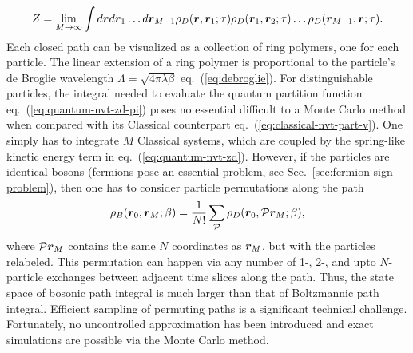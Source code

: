 \begin{align} \label{eq:quantum-nvt-zd-pi}
Z=\lim\limits_{M\rightarrow\infty} \int d\boldsymbol{r} d\boldsymbol{r}_1\dots d\boldsymbol{r}_{M-1}
\rho_D(\boldsymbol{r},\boldsymbol{r}_1;\tau)\rho_D(\boldsymbol{r}_1,\boldsymbol{r}_2;\tau)\dots\rho_D(\boldsymbol{r}_{M-1},\boldsymbol{r};\tau).
\end{align}
Each closed path can be visualized as a collection of ring polymers, one for each particle. The linear extension of a ring polymer is proportional to the particle's de Broglie wavelength $\Lambda=\sqrt{4\pi\lambda\beta}$ eq.~(\ref{eq:debroglie}).
For distinguishable particles, the integral needed to evaluate the quantum partition function eq.~(\ref{eq:quantum-nvt-zd-pi}) poses no essential difficult to a Monte Carlo method when compared with its Classical counterpart eq.~(\ref{eq:classical-nvt-part-v}). One simply has to integrate $M$ Classical systems, which are coupled by the spring-like kinetic energy term in eq.~(\ref{eq:quantum-nvt-zd}).
However, if the particles are identical bosons (fermions pose an essential problem, see Sec.~\ref{sec:fermion-sign-problem}), then one has to consider particle permutations along the path
\begin{align}
\rho_B(\boldsymbol{r}_0,\boldsymbol{r}_M;\beta) = \frac{1}{N!}\sum\limits_{\mathcal{P}} \rho_D(\boldsymbol{r}_0, \mathcal{P}\boldsymbol{r}_M;\beta),
\end{align}
where $\mathcal{P}\boldsymbol{r}_M$ contains the same $N$ coordinates as $\boldsymbol{r}_M$, but with the particles relabeled. This permutation can happen via any number of 1-, 2-, and upto $N$-particle exchanges between adjacent time slices along the path. Thus, the state space of bosonic path integral is much larger than that of Boltzmannic path integral. Efficient sampling of permuting paths is a significant technical challenge. Fortunately, no uncontrolled approximation has been introduced and exact simulations are possible via the Monte Carlo method.

